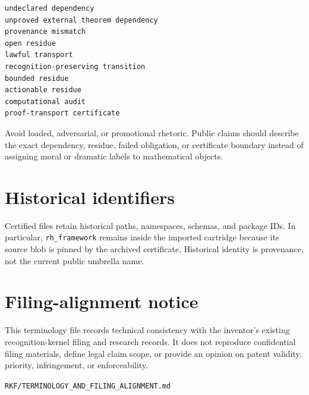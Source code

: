 \begin{verbatim}
undeclared dependency
unproved external theorem dependency
provenance mismatch
open residue
lawful transport
recognition-preserving transition
bounded residue
actionable residue
computational audit
proof-transport certificate
\end{verbatim}

Avoid loaded, adversarial, or promotional rhetoric. Public claims should describe the exact dependency, residue, failed obligation, or certificate boundary instead of assigning moral or dramatic labels to mathematical objects.

\hypertarget{historical-identifiers}{%
\section{Historical identifiers}\label{historical-identifiers}}

Certified files retain historical paths, namespaces, schemas, and package IDs. In particular, \texttt{rh\_framework} remains inside the imported cartridge because its source blob is pinned by the archived certificate. Historical identity is provenance, not the current public umbrella name.

\hypertarget{filing-alignment-notice}{%
\section{Filing-alignment notice}\label{filing-alignment-notice}}

This terminology file records technical consistency with the inventor's existing recognition-kernel filing and research records. It does not reproduce confidential filing materials, define legal claim scope, or provide an opinion on patent validity, priority, infringement, or enforceability.

\begin{flushright}\small\texttt{RKF/TERMINOLOGY\_AND\_FILING\_ALIGNMENT.md}\end{flushright}
